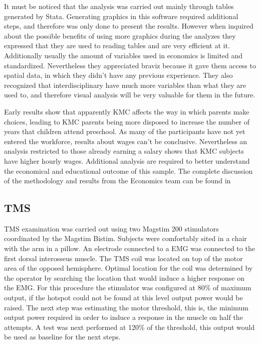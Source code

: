 It must be noticed that the analysis was carried out mainly through tables generated by Stata. Generating graphics in this software required additional steps, and therefore was only done to present the results. However when inquired about the possible benefits of using more graphics during the analyzes they expressed that they are used to reading tables and are very efficient at it. Additionally usually the amount of variables used in economics is limited and standardized. Nevertheless they appreciated braviz because it gave them access to spatial data, in which they didn't have any previous experience. They also recognized that interdisciplinary have much more variables than what they are used to, and therefore visual analysis will be very valuable for them in the future.

Early results show that apparently KMC affects the way in which parents make choices, leading to KMC parents being more disposed to increase the number of years that children attend preschool. As many of the participants have not yet entered the workforce, results about wages can't be conclusive. Nevertheless an analysis restricted to those already earning a salary shows that KMC subjects have higher hourly wages. Additional analysis are required to better understand the economical and educational outcome of this sample.  The complete discussion of the methodology and results from the Economics team can be found in \autocite{?}
\subsection{TMS}

TMS examination was carried out using two Magstim 200 stimulators coordinated by the Magstim Bistim. Subjects were comfortably sited in a chair with the arm in a pillow. An electrode connected to a EMG was connected to the first dorsal interosseus muscle. The TMS coil was located on top of the motor area of the opposed hemisphere. Optimal location for the coil was determined by the operator by searching the location that would induce a higher response on the EMG. For this procedure the stimulator was configured at 80\% of maximum output, if the hotspot could not be found at this level output power would be raised. The next step was estimating the motor threshold, this is, the minimum output power required in order to induce a response in the muscle on half the attempts. A test was next performed at 120\% of the threshold, this output would be used as baseline for the next steps.

